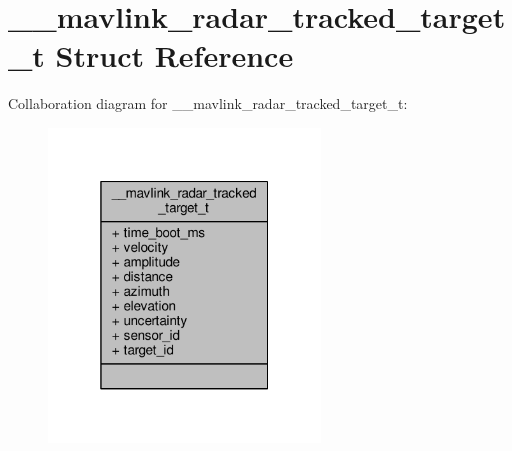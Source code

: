 \hypertarget{struct____mavlink__radar__tracked__target__t}{\section{\+\_\+\+\_\+mavlink\+\_\+radar\+\_\+tracked\+\_\+target\+\_\+t Struct Reference}
\label{struct____mavlink__radar__tracked__target__t}
}


Collaboration diagram for \+\_\+\+\_\+mavlink\+\_\+radar\+\_\+tracked\+\_\+target\+\_\+t\+:
\nopagebreak
\begin{figure}[H]
\begin{center}
\leavevmode
\includegraphics[width=205pt]{struct____mavlink__radar__tracked__target__t__coll__graph}
\end{center}
\end{figure}
